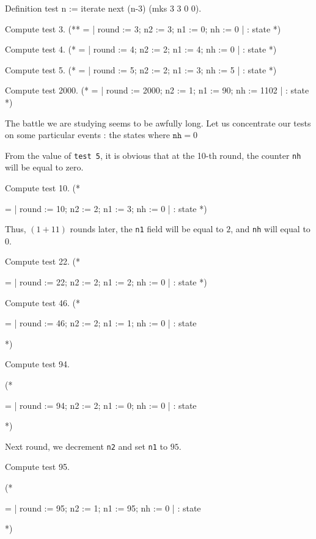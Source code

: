 \documentclass[a4paper]{book}
\begin{document}
\begin{Coqsrc}
Definition test n := iterate next (n-3) (mks 3 3 0 0).

Compute test 3.
   (**
     = {| round := 3; n2 := 3; n1 := 0; nh := 0 |}
     : state
    *)

Compute test 4.
 (*
  = {| round := 4; n2 := 2; n1 := 4; nh := 0 |}
     : state
 *)

Compute test 5.
 (*
   = {| round := 5; n2 := 2; n1 := 3; nh := 5 |}
     : state
 *)

Compute test 2000.
(*
  = {| round := 2000; n2 := 1; n1 := 90; nh := 1102 |}
     : state
*)
\end{Coqsrc}


The battle we are studying seems to be awfully long. Let us concentrate our
tests on some particular events : the states where $\texttt{nh}=0$ 

From the value of \texttt{test 5},  it is obvious that at the 10-th round, the counter \texttt{nh} will be
equal to zero.

 \begin{Coqsrc}
 Compute test 10.
(*

    = {| round := 10; n2 := 2; n1 := 3; nh := 0 |}
     : state
*)
 \end{Coqsrc}

Thus, $ (1 + 11)$ rounds later, the \texttt{n1} field will be equal to $2$, and 
\texttt{nh}  will equal to $0$. 


\begin{Coqsrc}
Compute test 22.
(*

 = {| round := 22; n2 := 2; n1 := 2; nh := 0 |}
     : state
*)
\end{Coqsrc}


\begin{Coqsrc}
 Compute test 46.
(*

 = {| round := 46; n2 := 2; n1 := 1; nh := 0 |}
     : state

*)

Compute test 94.

(*

 = {| round := 94; n2 := 2; n1 := 0; nh := 0 |}
     : state

*) 
\end{Coqsrc}


Next round, we decrement \texttt{n2} and set \texttt{n1} to $95$.


\begin{Coqsrc}
 Compute test 95.

(*

  = {| round := 95; n2 := 1; n1 := 95; nh := 0 |}
     : state

*)
\end{Coqsrc}
\end{document}
